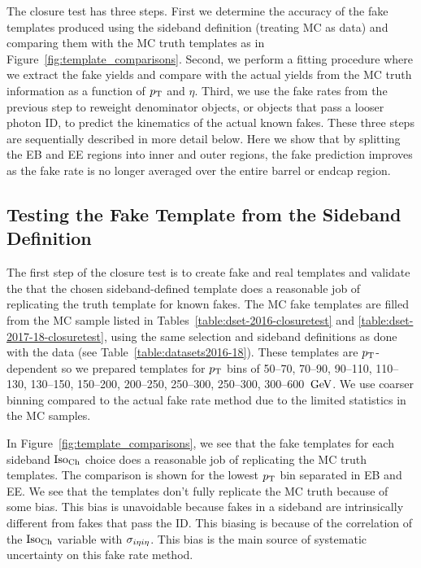  The closure test has three steps. First we determine the accuracy of the fake templates produced using the sideband definition (treating MC as data) and comparing them with the MC truth templates as in Figure~\ref{fig:template_comparisons}. Second, we perform a fitting procedure where we extract the fake yields and compare with the actual yields from the MC truth information as a function of $p_{\mathrm{T}}$ and $\eta$. Third, we use the fake rates from the previous step to reweight denominator objects, or objects that pass a looser photon ID, to predict the kinematics of the actual known fakes. These three steps are sequentially described in more detail below. Here we show that by splitting the EB and EE regions into inner and outer regions, the fake prediction improves as the fake rate is no longer averaged over the entire barrel or endcap region.



\subsection{Testing the Fake Template from the Sideband Definition}

The first step of the closure test is to create fake and real templates and validate the that the chosen sideband-defined template does a reasonable job of replicating the truth template for known fakes. The MC fake templates are filled from the MC sample listed in Tables~\ref{table:dset-2016-closuretest} and \ref{table:dset-2017-18-closuretest}, using the same selection and sideband definitions as done with the data (see Table~\ref{table:datasets2016-18}).  These templates are $p_{\mathrm{T}}$-dependent so we prepared templates for $p_{\mathrm{T}}$ bins of 50--70, 70--90, 90--110, 110--130, 130--150, 150--200, 200--250, 250--300, 250--300, 300--600 $\,\text{Ge\hspace{-.08em}V}$. We use coarser binning compared to the actual fake rate method due to the limited statistics in the MC samples.

In Figure~\ref{fig:template_comparisons}, we see that the fake templates for each sideband $\text{Iso}_{\text{Ch}}$ choice does a reasonable job of replicating the MC truth templates. The comparison is shown for the lowest $p_{\mathrm{T}}$ bin separated in EB and EE. We see that the templates don't fully replicate the MC truth because of some bias. This bias is unavoidable because fakes in a sideband are intrinsically different from fakes that pass the ID. This biasing is because of the correlation of the $\text{Iso}_{\text{Ch}}$ variable with $\sigma_{i\eta i\eta}$. This bias is the main source of systematic uncertainty on this fake rate method.

